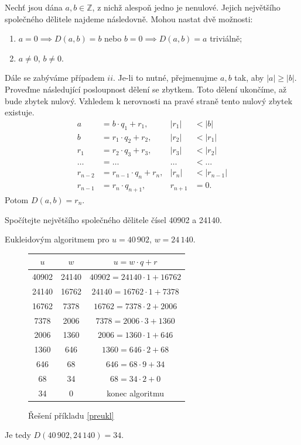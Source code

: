 \begin{algoritmus}\label{eukleiduvalg}
Nechť jsou dána $a,b \in \mathbb Z$, z nichž alespoň jedno je nenulové. Jejich největšího společného
dělitele najdeme následovně. Mohou nastat dvě možnosti:
\begin{enumerate}[$i.$]
  \item $a = 0 \implies D(a, b) = b$ nebo $b=0 \implies D(a,b)=a$ triviálně;
  \item $a \ne 0$, $b \ne 0$.
\end{enumerate}
Dále se zabýváme případem $ii$. Je-li to nutné, přejmenujme $a,b$ tak, aby $|a|\geq |b|$.
Proveďme následující posloupnost dělení se zbytkem. Toto dělení ukončíme, až bude zbytek nulový.
Vzhledem k nerovnosti na pravé straně tento nulový zbytek existuje.
\begin{align*}
  a & = b \cdot q_1 + r_1,  & |r_1| & < |b| \\
  b & = r_1 \cdot q_2 + r_2, & |r_2| & < |r_1| \\
  r_1 & = r_2 \cdot q_3 + r_3, & |r_3| & < |r_2|\\
  \dots & = \dots & \dots & < \dots\\
  r_{n-2} & = r_{n-1} \cdot q_n + r_n, & |r_n| & < |r_{n-1}| \\
  r_{n-1} & = r_{n} \cdot q_{n+1}, & r_{n+1} & = 0.
\end{align*}
Potom $D(a,b) = r_n$.
\end{algoritmus}

\begin{priklad}\label{preukl}
  Spočítejte největšího společného dělitele čísel 40902 a 24140.
\end{priklad}

\begin{reseni}
  Eukleidovým algoritmem pro $u = 40\,902$, $w = 24\,140$.
  \begin{figure}[h]
	\centering
	\begin{tabular}{c | c | c}
      $u$ & $w$ & $u=w\cdot q+r$  \\
      \hline
      40902 & 24140 & $40902 = 24140\cdot1 + 16762$ \\
      24140 & 16762 & $24140 = 16762\cdot1 + 7378$ \\
      16762 & 7378 & $16762 = 7378\cdot2 + 2006$  \\
      7378 & 2006 & $7378 = 2006\cdot3 + 1360$  \\
      2006 & 1360 & $2006 = 1360\cdot1 + 646$  \\
      1360 & 646 & $1360 = 646\cdot2 + 68$  \\
      646 & 68 & $646 = 68\cdot9 + 34$  \\
      68 & 34 & $68 = 34\cdot2 + 0$  \\
      34 & 0 & konec algoritmu  \\
    \end{tabular}
	\caption{Řešení příkladu \ref{preukl}}
  \end{figure}
  Je tedy $D(40\,902, 24\,140) = 34$.
\end{reseni}

